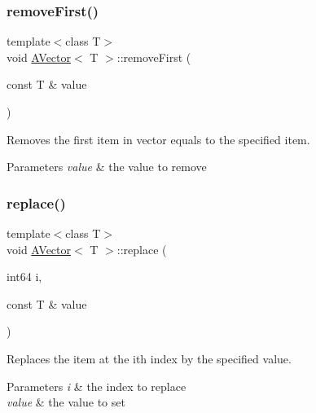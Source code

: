 \subsubsection{\texorpdfstring{removeFirst()}{removeFirst()}}
{\footnotesize\ttfamily template$<$class T$>$ \\
void \mbox{\hyperlink{class_a_vector}{A\+Vector}}$<$ T $>$\+::remove\+First (\begin{DoxyParamCaption}\item[{const T \&}]{value }\end{DoxyParamCaption})}



Removes the first item in vector equals to the specified item. 


\begin{DoxyParams}{Parameters}
{\em value} & the value to remove \\
\hline
\end{DoxyParams}
\mbox{\label{class_a_vector_aaa3f52e1356f810f38551cc877e0f32f}} 
\subsubsection{\texorpdfstring{replace()}{replace()}}
{\footnotesize\ttfamily template$<$class T$>$ \\
void \mbox{\hyperlink{class_a_vector}{A\+Vector}}$<$ T $>$\+::replace (\begin{DoxyParamCaption}\item[{int64}]{i,  }\item[{const T \&}]{value }\end{DoxyParamCaption})}



Replaces the item at the ith index by the specified value. 


\begin{DoxyParams}{Parameters}
{\em i} & the index to replace \\
\hline
{\em value} & the value to set \\
\hline
\end{DoxyParams}
\mbox{\label{class_a_vector_a7cc825790e29f58f9425fd11efbdbbab}} 
